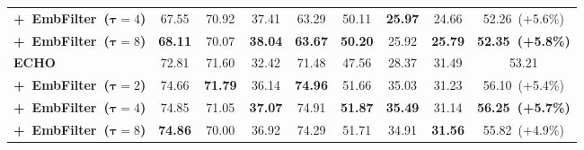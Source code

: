 \documentclass[sigconf]{acmart}
\begin{document}
\begin{table}[t]
{\begin{tabular}{lcccccccc}
            \quad \textbf{\textrm{+~EmbFilter~(\(\mathbf{\tau}=4\))}} & \cellcolor{DodgerBlue!15} 67.55 & 70.92 & \cellcolor{DodgerBlue!15} 37.41 & \cellcolor{DodgerBlue!15} 63.29 & \cellcolor{DodgerBlue!15} 50.11 & \cellcolor{DodgerBlue!15} \textbf{25.97} & 24.66 & \cellcolor{DodgerBlue!15} 52.26~(+5.6\%) \\
            \quad \textbf{\textrm{+~EmbFilter~(\(\mathbf{\tau}=8\))}} & \cellcolor{DodgerBlue!15} \textbf{68.11} & 70.07 & \cellcolor{DodgerBlue!15} \textbf{38.04} & \cellcolor{DodgerBlue!15} \textbf{63.67} & \cellcolor{DodgerBlue!15} \textbf{50.20} & \cellcolor{DodgerBlue!15} 25.92 & \cellcolor{DodgerBlue!15} \textbf{25.79} &  \cellcolor{DodgerBlue!15} \textbf{52.35~(+5.8\%) }\\
            \cmidrule(l{4pt}r{4pt}){1-9}
            \textbf{\textrm{ECHO}}  & 72.81 & 71.60 & 32.42 & 71.48 & 47.56 & 28.37 & 31.49 & 53.21 \\
            \cmidrule(l{1pt}r{1pt}){1-9}
            \quad \textbf{\textrm{+~EmbFilter~(\(\mathbf{\tau}=2\))}} & \cellcolor{DodgerBlue!15} 74.66 & \cellcolor{DodgerBlue!15} \textbf{71.79} & \cellcolor{DodgerBlue!15} 36.14 & \cellcolor{DodgerBlue!15} \textbf{74.96} & \cellcolor{DodgerBlue!15} 51.66 & \cellcolor{DodgerBlue!15} 35.03 & 31.23 & \cellcolor{DodgerBlue!15} 56.10~(+5.4\%) \\
            \quad \textbf{\textrm{+~EmbFilter~(\(\mathbf{\tau}=4\))}}  & \cellcolor{DodgerBlue!15} 74.85 & 71.05 & \cellcolor{DodgerBlue!15} \textbf{37.07} & \cellcolor{DodgerBlue!15} 74.91 & \cellcolor{DodgerBlue!15} \textbf{51.87} & \cellcolor{DodgerBlue!15} \textbf{35.49} & 31.14 & \cellcolor{DodgerBlue!15} \textbf{56.25~(+5.7\%) }\\
            \quad \textbf{\textrm{+~EmbFilter~(\(\mathbf{\tau}=8\))}} & \cellcolor{DodgerBlue!15} \textbf{74.86} & 70.00 & \cellcolor{DodgerBlue!15} 36.92 & \cellcolor{DodgerBlue!15} 74.29 & \cellcolor{DodgerBlue!15} 51.71 & \cellcolor{DodgerBlue!15} 34.91 & \cellcolor{DodgerBlue!15} \textbf{31.56} & \cellcolor{DodgerBlue!15} 55.82~(+4.9\%) \\

            \bottomrule
        \end{tabular}
    }
\end{table}
\end{document}
